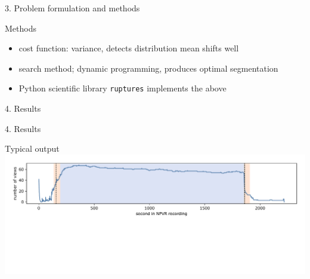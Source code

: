 \documentclass[first=orange,second=blue,logo=blueque]{aaltoslides}
\begin{document}

\begin{frame}{3. Problem formulation and methods}
    \begin{block}{{\color{black}Methods}}
        \begin{itemize}
            \item \alert{cost function}: variance, detects distribution mean shifts well
            \item \alert{search method}; dynamic programming, produces optimal segmentation
            \item Python scientific library \texttt{ruptures} implements the above
        \end{itemize}
    \end{block}
\end{frame}


\begin{frame}{4. Results}
\end{frame}


\begin{frame}{4. Results}
    \begin{block}{{\color{black}Typical output}}
        \includegraphics[width=1\textwidth]{figures/output0.pdf}
    \end{block}
\end{frame}
\end{document}
